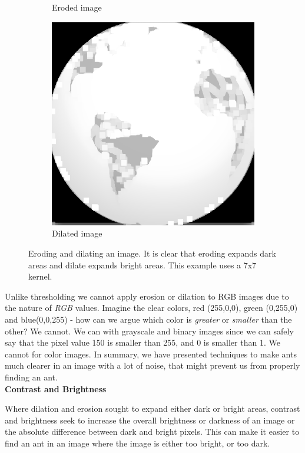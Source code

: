\begin{figure}[!ht]
\begin{subfigure}[b]{0.3\textwidth}
                \caption{Eroded image}
        \end{subfigure}
		\quad
        \begin{subfigure}[b]{0.3\textwidth}
                \includegraphics[scale = 0.2]{img/dilate}
                \caption{Dilated image}
        \end{subfigure}
		\caption{Eroding and dilating an image. It is clear that eroding expands dark areas and dilate expands bright areas. This example uses a 7x7 kernel.}
		\label{fig:erodedilate}
\end{figure}

Unlike thresholding we cannot apply erosion or dilation to RGB images due to the nature of \textit{RGB} values. Imagine the clear colors, red (255,0,0), green (0,255,0) and blue(0,0,255) - how can we argue which color is \textit{greater} or \textit{smaller} than the other? We cannot. We can with grayscale and binary images since we can safely say that the pixel value 150 is smaller than 255, and 0 is smaller than 1. We cannot for color images. In summary, we have presented techniques to make ants much clearer in an image with a lot of noise, that might prevent us from properly finding an ant.\\

\noindent \textbf{Contrast and Brightness} \par
Where dilation and erosion sought to expand either dark or bright areas, contrast and brightness seek to increase the overall brightness or darkness of an image or the absolute difference between dark and bright pixels. This can make it easier to find an ant in an image where the image is either too bright, or too dark.\\

